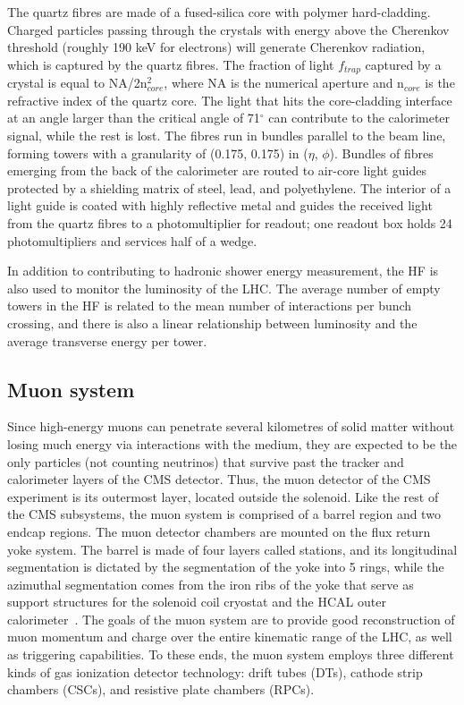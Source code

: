 The quartz fibres are made of a fused-silica core with polymer hard-cladding. Charged particles passing through the crystals with energy above the Cherenkov threshold (roughly 190 keV for electrons) will generate Cherenkov radiation, which is captured by the quartz fibres. The fraction of light $f_{trap}$ captured by a crystal is equal to NA/2n$_{core}^2$, where NA is the numerical aperture and n$_{core}$ is the refractive index of the quartz core. The light that hits the core-cladding interface at an angle larger than the critical angle of 71$^{\circ}$ can contribute to the calorimeter signal, while the rest is lost. The fibres run in bundles parallel to the beam line, forming towers with a granularity of (0.175, 0.175) in ($\eta$, $\phi$). Bundles of fibres emerging from the back of the calorimeter are routed to air-core light guides protected by a shielding matrix of steel, lead, and polyethylene. The interior of a light guide is coated with highly reflective metal and guides the received light from the quartz fibres to a photomultiplier for readout; one readout box holds 24 photomultipliers and services half of a wedge.

In addition to contributing to hadronic shower energy measurement, the HF is also used to monitor the luminosity of the LHC. The average number of empty towers in the HF is related to the mean number of interactions per bunch crossing, and there is also a linear relationship between luminosity and the average transverse energy per tower.

\subsection{Muon system\label{sec:cms-muon}}
Since high-energy muons can penetrate several kilometres of solid matter without losing much energy via interactions with the medium, they are expected to be the only particles (not counting neutrinos) that survive past the tracker and calorimeter layers of the CMS detector. Thus, the muon detector of the CMS experiment is its outermost layer, located outside the solenoid. Like the rest of the CMS subsystems, the muon system is comprised of a barrel region and two endcap regions. The muon detector chambers are mounted on the flux return yoke system. The barrel is made of four layers called stations, and its longitudinal segmentation is dictated by the segmentation of the yoke into 5 rings, while the azimuthal segmentation comes from the iron ribs of the yoke that serve as support structures for the solenoid coil cryostat and the HCAL outer calorimeter~\cite{MuonTDR}. The goals of the muon system are to provide good reconstruction of muon momentum and charge over the entire kinematic range of the LHC, as well as triggering capabilities. To these ends, the muon system employs three different kinds of gas ionization detector technology: drift tubes (DTs), cathode strip chambers (CSCs), and resistive plate chambers (RPCs).

